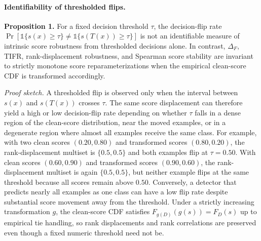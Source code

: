 \documentclass[a4paper,fleqn]{cas-dc}
\begin{document}
\paragraph{Identifiability of thresholded flips.}
\textbf{Proposition 1.} For a fixed decision threshold $\tau$, the
decision-flip rate
$\Pr[\mathbb{1}\{s(x)\geq\tau\}\neq\mathbb{1}\{s(T(x))\geq\tau\}]$ is not an
identifiable measure of intrinsic score robustness from thresholded decisions
alone. In contrast, $\Delta_F$, TIFR, rank-displacement robustness, and
Spearman score stability are invariant to strictly monotone score
reparameterizations when the empirical clean-score CDF is transformed
accordingly.

\textit{Proof sketch.} A thresholded flip is observed only when the interval
between $s(x)$ and $s(T(x))$ crosses $\tau$. The same score displacement can
therefore yield a high or low decision-flip rate depending on whether $\tau$
falls in a dense region of the clean-score distribution, near the moved
examples, or in a degenerate region where almost all examples receive the same
class. For example, with two clean scores $(0.20,0.80)$ and transformed scores
$(0.80,0.20)$, the rank-displacement multiset is $\{0.5,0.5\}$ and both
examples flip at $\tau=0.50$. With clean scores $(0.60,0.90)$ and transformed
scores $(0.90,0.60)$, the rank-displacement multiset is again $\{0.5,0.5\}$,
but neither example flips at the same threshold because all scores remain above
$0.50$. Conversely, a detector that predicts nearly all examples as one class
can have a low flip rate despite substantial score movement away from the
threshold. Under a strictly increasing transformation $g$, the clean-score CDF
satisfies $F_{g(D)}(g(s))=F_D(s)$ up to empirical tie handling, so rank
displacements and rank correlations are preserved even though a fixed numeric
threshold need not be.
\end{document}

